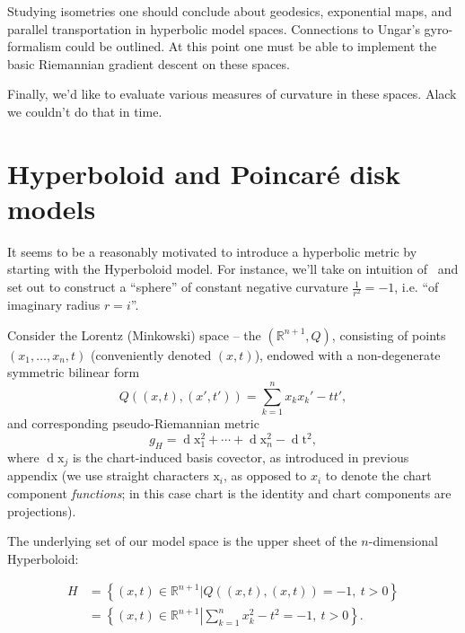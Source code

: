 Studying isometries one should conclude about geodesics, exponential maps, and
parallel transportation in hyperbolic model spaces. Connections to Ungar's
gyro-formalism could be outlined. At this point one must be able to implement
the basic Riemannian gradient descent on these spaces.

Finally, we'd like to evaluate various measures of curvature in these spaces.
Alack we couldn't do that in time.

\section{Hyperboloid and Poincar\'e disk models} \label{sec:poincareBall}

It seems to be a reasonably motivated to introduce a hyperbolic metric by
starting with the Hyperboloid model. For instance, we'll take on intuition
of~\cite{thurstonThree} and set out to construct a ``sphere'' of constant
negative curvature \( \frac{1}{r^2} = -1 \), i.e. ``of imaginary radius \( r=i
\)''.

Consider the Lorentz (Minkowski) space -- the \( (\mathbb{R}^{n+1}, Q) \),
consisting of points \( (x_1, \ldots, x_n, t) \) (conveniently denoted \( (x,
t) \)), endowed with a non-degenerate symmetric bilinear form
\[ Q((x, t), (x', t')) = \sum_{k=1}^n x_k x_k' - tt', \]
and corresponding pseudo-Riemannian metric \[ g_H = \operatorname{d}\mathrm{x}_1^2 +
\cdots + \operatorname{d}\mathrm{x}_n^2 - \operatorname{d}\mathrm{t}^2, \]
where \( \operatorname{d}\mathrm{x}_j \) is the chart-induced basis covector, as
introduced in previous appendix (we use straight characters \( \mathrm{x}_i \),
as opposed to \( x_i \) to denote the chart component \emph{functions}; in this
case chart is the identity and chart components are projections).

The underlying set of our model space is the upper sheet of the \(n\)-dimensional
Hyperboloid:

\begin{align*}
H &= \left\{ (x, t) \in \mathbb{R}^{n+1} \left| Q((x,t), (x,t)) = -1,~ t>0 \right.\right\}\\
&= \left\{ (x, t) \in \mathbb{R}^{n+1} \left| \sum_{k=1}^n x_k^2 - t^2 = -1,~t>0 \right.\right\}.
\end{align*}


